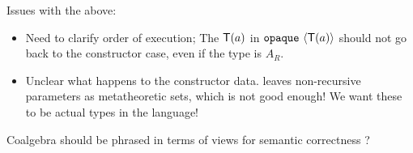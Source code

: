 Issues with the above:

\begin{itemize}
  \item Need to clarify order of execution; The ${\textsf{T}}(a)$ in $\texttt{opaque}\
          \langle{{\textsf{T}}(a)}\rangle$ should not go back to the constructor case, even if the type
        is $A_R$.
  \item Unclear what happens to the constructor data. \cite{Kaposi2020-is} leaves
        non-recursive parameters as metatheoretic sets, which is not good enough! We
        want these to be actual types in the language!
\end{itemize}

Coalgebra should be phrased in terms of views for semantic correctness
\cite{Allais2023-pf,Allais2023-zq} ?
